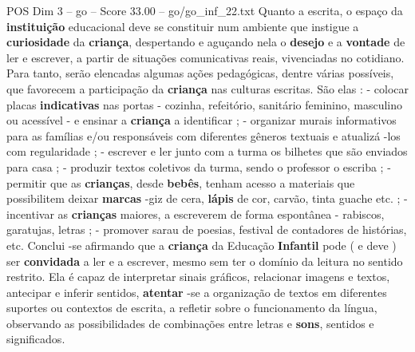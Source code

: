\begin{textsample}{POS Dim 3 – go – Score 33.00 – go/go\_inf\_22.txt}
Quanto a escrita, o espaço da \textbf{instituição} educacional deve se constituir num ambiente que instigue a \textbf{curiosidade} da \textbf{criança}, despertando e aguçando nela o \textbf{desejo} e a \textbf{vontade} de ler e escrever, a partir de situações comunicativas reais, vivenciadas no cotidiano.
Para tanto, serão elencadas algumas ações pedagógicas, dentre várias possíveis, que favorecem a participação da \textbf{criança} nas culturas escritas.
São elas : - colocar placas \textbf{indicativas} nas portas - cozinha, refeitório, sanitário feminino, masculino ou acessível - e ensinar a \textbf{criança} a identificar ; - organizar murais informativos para as famílias e/ou responsáveis com diferentes gêneros textuais e atualizá -los com regularidade ; - escrever e ler junto com a turma os bilhetes que são enviados para casa ; - produzir textos coletivos da turma, sendo o professor o escriba ; - permitir que as \textbf{crianças}, desde \textbf{bebês}, tenham acesso a materiais que possibilitem deixar \textbf{marcas} -giz de cera, \textbf{lápis} de cor, carvão, tinta guache etc. ; - incentivar as \textbf{crianças} maiores, a escreverem de forma espontânea - rabiscos, garatujas, letras ; - promover sarau de poesias, festival de contadores de histórias, etc.
Conclui -se afirmando que a \textbf{criança} da Educação \textbf{Infantil} pode ( e deve ) ser \textbf{convidada} a ler e a escrever, mesmo sem ter o domínio da leitura no sentido restrito.
Ela é capaz de interpretar sinais gráficos, relacionar imagens e textos, antecipar e inferir sentidos, \textbf{atentar} -se a organização de textos em diferentes suportes ou contextos de escrita, a refletir sobre o funcionamento da língua, observando as possibilidades de combinações entre letras e \textbf{sons}, sentidos e significados.

\end{textsample}
